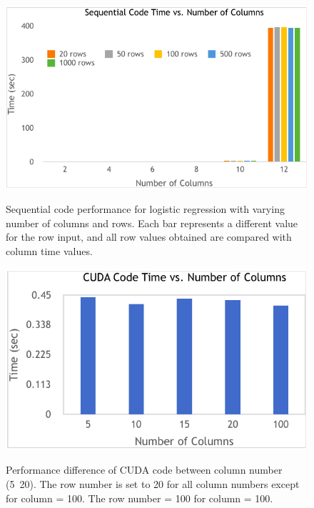 \documentclass[letterpaper, 10 pt, conference]{ieeeconf}  %
\begin{document}
   \begin{figure}[thpb]
      \centering
  		\includegraphics[width=\linewidth]{seqcode2.png}
  		\label{fig:seq1}
  		\caption{Sequential code performance for logistic regression with varying number of columns and rows. Each bar represents a different value for the row input, and all row values obtained are compared with column time values.}
   \end{figure}
	\begin{figure}[thpb]
		\centering
		\includegraphics[width=\linewidth]{cudacolumns.png}
		\label{fig:cudacol}
		\caption{Performance difference of CUDA code between column number (5~20). The row number is set to 20 for all column numbers except for column = 100. The row number = 100 for column = 100.}
	\end{figure}
\end{document}
